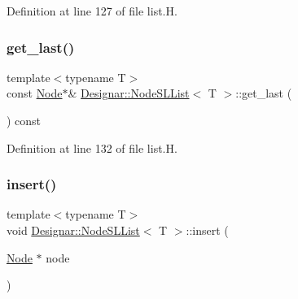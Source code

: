 Definition at line 127 of file list.\+H.

\mbox{\label{class_designar_1_1_node_s_l_list_acce6901e0e50d718aeff268506b6f2f1}} 
\subsubsection{\texorpdfstring{get\+\_\+last()}{get\_last()}\hspace{0.1cm}{\footnotesize\ttfamily [2/2]}}
{\footnotesize\ttfamily template$<$typename T$>$ \\
const \hyperlink{class_designar_1_1_node_s_l_list_a41963019ada1025099e3259207a3de96}{Node}$\ast$\& \hyperlink{class_designar_1_1_node_s_l_list}{Designar\+::\+Node\+S\+L\+List}$<$ T $>$\+::get\+\_\+last (\begin{DoxyParamCaption}{ }\end{DoxyParamCaption}) const\hspace{0.3cm}{\ttfamily [inline]}}



Definition at line 132 of file list.\+H.

\mbox{\label{class_designar_1_1_node_s_l_list_aa6b522a7d687f39959d93ebc80903261}} 
\subsubsection{\texorpdfstring{insert()}{insert()}}
{\footnotesize\ttfamily template$<$typename T$>$ \\
void \hyperlink{class_designar_1_1_node_s_l_list}{Designar\+::\+Node\+S\+L\+List}$<$ T $>$\+::insert (\begin{DoxyParamCaption}\item[{\hyperlink{class_designar_1_1_node_s_l_list_a41963019ada1025099e3259207a3de96}{Node} $\ast$}]{node }\end{DoxyParamCaption})\hspace{0.3cm}{\ttfamily [inline]}}



